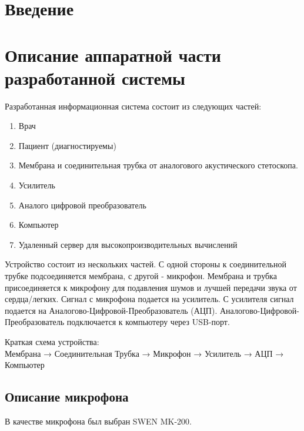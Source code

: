 \documentclass[14pt]{extarticle}
\begin{document}
\begin{titlepage}

\end{titlepage}

\tableofcontents
\newpage 

\section{Введение}

\newpage  

\section{Описание аппаратной части разработанной системы}
Разработанная информационная система состоит из следующих частей:
\begin{enumerate}
  \item Врач
  \item Пациент (диагностируемы)
  \item Мембрана и соединительная трубка от аналогового акустического стетоскопа.
  \item Усилитель
  \item Аналого цифровой преобразователь
  \item Компьютер
  \item Удаленный сервер для высокопроизводительных вычислений
\end{enumerate}

Устройство состоит из нескольких частей. С одной стороны к соединительной трубке подсоединяется мембрана, с другой - микрофон. Мембрана и трубка присоединяется к микрофону для подавления шумов и лучшей передачи звука от сердца/легких. Сигнал с микрофона подается на усилитель. С усилителя сигнал подается на Аналогово-Цифровой-Преобразователь (АЦП). Аналогово-Цифровой-Преобразователь подключается к компьютеру через USB-порт.

\begin{center}
Краткая схема устройства:\\
\noindent\small{{Мембрана → Соединительная Трубка → Микрофон → Усилитель → АЦП → Компьютер}}
\end{center}


\subsection{Описание микрофона}
В качестве микрофона был выбран SWEN MK-200. \\
\end{document}
